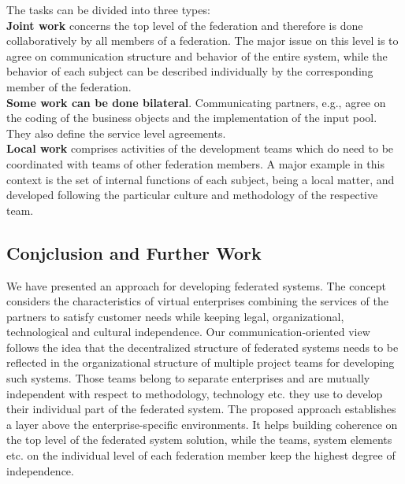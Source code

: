 The tasks can be divided into three types:\\
\textbf{Joint work} concerns the top level of the federation and therefore is done collaboratively by all members of a federation. The major issue on this level is to agree on communication structure and behavior of the entire system, while the behavior of each subject can be described individually by the corresponding member of the federation.\\
\textbf{Some work can be done bilateral}. Communicating partners, e.g., agree on the coding of the business objects and the implementation of the input pool. They also define the service level agreements.\\
\textbf{Local work} comprises activities of the development teams which do need to be coordinated with teams of other federation members. A major example in this context is the set of internal functions of each subject, being a local matter, and developed following the particular culture and methodology of the respective team.
\\


\subsection{Conjclusion and Further Work}
We have presented an approach for developing federated systems. The concept considers the characteristics of virtual enterprises combining the services of the partners to satisfy customer needs while keeping legal, organizational, technological and cultural independence.
Our communication-oriented view follows the idea that the decentralized structure of federated systems needs to be reflected in the organizational structure of multiple project teams for developing such systems. Those teams belong to separate enterprises and are mutually independent with respect to methodology, technology etc. they use to develop their individual part of the federated system. 
The proposed approach establishes a layer above the enterprise-specific environments. It helps building coherence on the top level of the federated system solution, while the teams, system elements etc. on the individual level of each federation member keep the highest degree of independence.
\\




